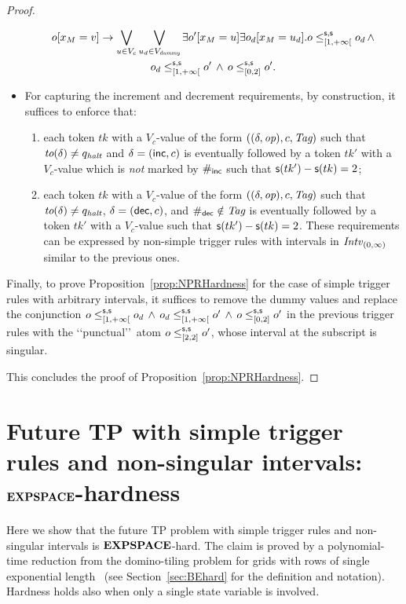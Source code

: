 \begin{proof}
\begin{itemize}
%
\begin{multline*}
o[x_M=v] \rightarrow \bigvee_{u\in V_{c}}\bigvee_{u_d\in V_{\textit{dummy}}} \exists  o'[x_M= u]\exists  o_d[x_M= u_d].  o\leq^{\mathsf{s},\mathsf{s}}_{[1,+\infty[} o_d \,\wedge\\ o_d\leq^{\mathsf{s},\mathsf{s}}_{[1,+\infty[}o'\, \wedge\, o\leq^{\mathsf{s},\mathsf{s}}_{[0,2]} o'.
\end{multline*}
  \item For capturing the increment and decrement requirements, by construction, it suffices to enforce that: 
  \begin{enumerate}
    \item each token $tk$  with
    a $V_{c}$-value of the form $((\delta,{\textit{op}}),c,{\textit{Tag}})$  such that ${\textit{to}}(\delta)\neq q_{\textit{halt}}$ and $\delta=({\mathsf{inc}},c)$ is eventually followed by a token $tk'$ with a $V_{c}$-value which is \emph{not} marked by $\#_{\mathsf{inc}}$ such that  $\mathsf{s}(tk')-\mathsf{s}(tk)=2$; 
    \item
  each token $tk$  with
    a $V_{c}$-value of the form $((\delta,{\textit{op}}),c,{\textit{Tag}})$  such that ${\textit{to}}(\delta)\neq q_{\textit{halt}}$, $\delta=({\mathsf{dec}},c)$, and  $\#_{\mathsf{dec}}\notin {\textit{Tag}}$ is eventually followed by a token $tk'$ with a $V_{c}$-value  such that  $\mathsf{s}(tk')-\mathsf{s}(tk)=2$. These requirements can be expressed by non-simple trigger rules with intervals in ${\mathit{Intv}}_{(0,\infty)}$ similar to the previous ones.
  \end{enumerate}    
\end{itemize}
Finally, to prove Proposition~\ref{prop:NPRHardness} for the case of simple trigger rules with arbitrary intervals, it suffices to remove the dummy values and replace the conjunction
  $o\leq^{\mathsf{s},\mathsf{s}}_{[1,+\infty[} o_d \,\wedge\, o_d\leq^{\mathsf{s},\mathsf{s}}_{[1,+\infty[}o'\, \wedge\, o\leq^{\mathsf{s},\mathsf{s}}_{[0,2]} o'$ in the previous trigger
  rules with the \lq\lq punctual\rq\rq\ atom $ o\leq^{\mathsf{s},\mathsf{s}}_{[2,2]} o'$, whose interval at the subscript is singular.

  This concludes the proof of Proposition~\ref{prop:NPRHardness}.
\end{proof}

\section[Future TP, simple trigger rules, non-sing.\ intervals: $\EXPSPACE$-hardness]{Future TP with simple trigger rules and non-singular intervals: $\EXPSPACE$-hardness}\label{sec:EXPSPHardFutTP}

Here we show that the future TP problem with simple trigger rules and non-singular intervals
is $\EXPSPACE$-hard. 
%
The claim is proved by a polynomial-time reduction from the domino-tiling problem for grids with rows of single exponential length~\cite{harel92} (see Section~\ref{sec:BEhard} for the definition and notation). 
Hardness holds also when only a single state variable is involved.

